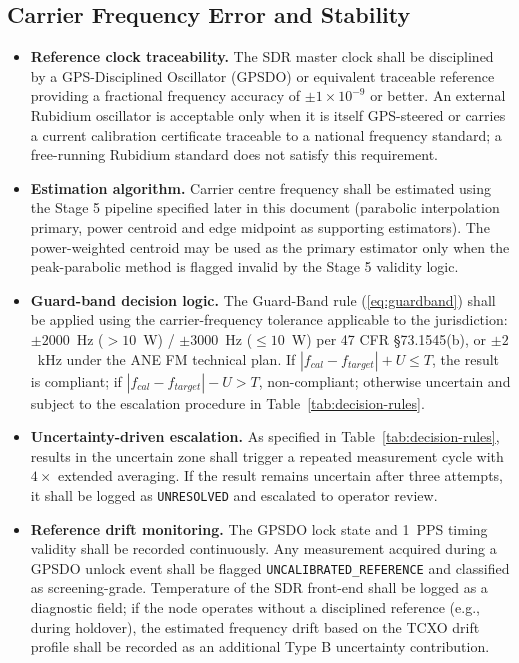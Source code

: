 \documentclass[11pt]{article}
\begin{document}
\subsection*{Carrier Frequency Error and Stability}

\begin{itemize}
    \item \textbf{Reference clock traceability.} The SDR master clock shall be disciplined by a GPS-Disciplined Oscillator (GPSDO) or equivalent traceable reference providing a fractional frequency accuracy of $\pm 1 \times 10^{-9}$ or better. An external Rubidium oscillator is acceptable only when it is itself GPS-steered or carries a current calibration certificate traceable to a national frequency standard; a free-running Rubidium standard does not satisfy this requirement.
    \item \textbf{Estimation algorithm.} Carrier centre frequency shall be estimated using the Stage 5 pipeline specified later in this document (parabolic interpolation primary, power centroid and edge midpoint as supporting estimators). The power-weighted centroid may be used as the primary estimator only when the peak-parabolic method is flagged invalid by the Stage 5 validity logic.
    \item \textbf{Guard-band decision logic.} The Guard-Band rule (\eqref{eq:guardband}) shall be applied using the carrier-frequency tolerance applicable to the jurisdiction: $\pm 2000$~Hz ($>10$~W) / $\pm 3000$~Hz ($\le 10$~W) per 47 CFR \S73.1545(b), or $\pm 2$~kHz under the ANE FM technical plan. If $|f_{cal} - f_{target}| + U \leq T$, the result is compliant; if $|f_{cal} - f_{target}| - U > T$, non-compliant; otherwise uncertain and subject to the escalation procedure in Table~\ref{tab:decision-rules}.
    \item \textbf{Uncertainty-driven escalation.} As specified in Table~\ref{tab:decision-rules}, results in the uncertain zone shall trigger a repeated measurement cycle with $4\times$ extended averaging. If the result remains uncertain after three attempts, it shall be logged as \texttt{UNRESOLVED} and escalated to operator review.
    \item \textbf{Reference drift monitoring.} The GPSDO lock state and 1~PPS timing validity shall be recorded continuously. Any measurement acquired during a GPSDO unlock event shall be flagged \texttt{UNCALIBRATED\_REFERENCE} and classified as screening-grade. Temperature of the SDR front-end shall be logged as a diagnostic field; if the node operates without a disciplined reference (e.g., during holdover), the estimated frequency drift based on the TCXO drift profile shall be recorded as an additional Type B uncertainty contribution.
\end{itemize}
\end{document}
